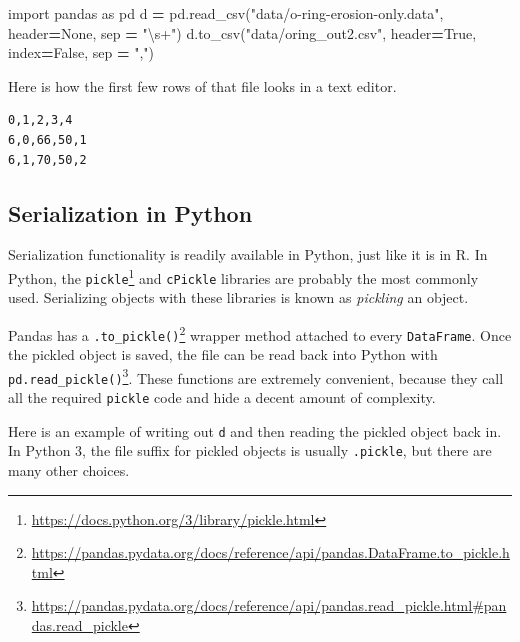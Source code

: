 \documentclass[
  12pt,
  krantz2]{krantz}
\makeatletter
\newenvironment{Shaded}{\begin{snugshade}}{\end{snugshade}}
\newcommand{\ImportTok}[1]{#1}
\newcommand{\NormalTok}[1]{#1}
\newcommand{\OperatorTok}[1]{\textcolor[rgb]{0.43,0.43,0.43}{\textbf{#1}}}
\newcommand{\StringTok}[1]{\textcolor[rgb]{0.5,0.5,0.5}{#1}}
\newcommand{\VariableTok}[1]{\textcolor[rgb]{0,0,0}{#1}}
\renewcommand{\href}[2]{#2\footnote{\url{#1}}}
\newenvironment{kframe}{%
\medskip{}
\setlength{\fboxsep}{.8em}
 \def\at@end@of@kframe{}%
 \ifinner\ifhmode%
  \def\at@end@of@kframe{\end{minipage}}%
  \begin{minipage}{\columnwidth}%
 \fi\fi%
 \def\FrameCommand##1{\hskip\@totalleftmargin \hskip-\fboxsep
 \colorbox{shadecolor}{##1}\hskip-\fboxsep
     \hskip-\linewidth \hskip-\@totalleftmargin \hskip\columnwidth}%
 \MakeFramed {\advance\hsize-\width
   \@totalleftmargin\z@ \linewidth\hsize
   \@setminipage}}%
 {\par\unskip\endMakeFramed%
 \at@end@of@kframe}
\renewenvironment{Shaded}{\begin{kframe}}{\end{kframe}}
\makeatother
\begin{document}
\begin{Shaded}
\begin{Highlighting}[]
\ImportTok{import}\NormalTok{ pandas }\ImportTok{as}\NormalTok{ pd}
\NormalTok{d }\OperatorTok{=}\NormalTok{ pd.read\_csv(}\StringTok{"data/o{-}ring{-}erosion{-}only.data"}\NormalTok{, }
\NormalTok{                header}\OperatorTok{=}\VariableTok{None}\NormalTok{, sep }\OperatorTok{=} \StringTok{"\textbackslash{}s+"}\NormalTok{)}
\NormalTok{d.to\_csv(}\StringTok{"data/oring\_out2.csv"}\NormalTok{, }
\NormalTok{         header}\OperatorTok{=}\VariableTok{True}\NormalTok{, index}\OperatorTok{=}\VariableTok{False}\NormalTok{, sep }\OperatorTok{=} \StringTok{","}\NormalTok{)}
\end{Highlighting}
\end{Shaded}

Here is how the first few rows of that file looks in a text editor.

\begin{verbatim}
0,1,2,3,4
6,0,66,50,1
6,1,70,50,2
\end{verbatim}

\hypertarget{serialization-in-python}{%
\subsection{Serialization in Python}\label{serialization-in-python}}

Serialization functionality is readily available in Python, just like it is in R. In Python, the \href{https://docs.python.org/3/library/pickle.html}{\texttt{pickle}} and \texttt{cPickle} libraries are probably the most commonly used. Serializing objects with these libraries is known as \emph{pickling} an object.

Pandas has a \href{https://pandas.pydata.org/docs/reference/api/pandas.DataFrame.to_pickle.html}{\texttt{.to\_pickle()}} wrapper method attached to every \texttt{DataFrame}. Once the pickled object is saved, the file can be read back into Python with \href{https://pandas.pydata.org/docs/reference/api/pandas.read_pickle.html\#pandas.read_pickle}{\texttt{pd.read\_pickle()}}. These functions are extremely convenient, because they call all the required \texttt{pickle} code and hide a decent amount of complexity.

Here is an example of writing out \texttt{d} and then reading the pickled object back in. In Python 3, the file suffix for pickled objects is usually \texttt{.pickle}, but there are many other choices.
\end{document}

